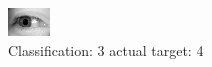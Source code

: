 \begin{figure}[h!]
\begin{center}
\includegraphics[width=0.60\columnwidth]{figures/ID3184_class_3_target_4.png}
\end{center}
\caption{ Classification: 3 actual target: 4}
\label{fig:ID3184_class_3_target_4}
\end{figure}
